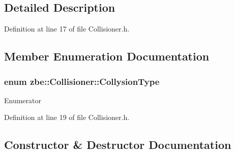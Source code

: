 \subsection{Detailed Description}


Definition at line 17 of file Collisioner.\+h.



\subsection{Member Enumeration Documentation}
\hypertarget{classzbe_1_1_collisioner_af210f5ae0183381df428b4b4f72946eb}{}
\subsubsection[{Collysion\+Type}]{\setlength{\rightskip}{0pt plus 5cm}enum {\bf zbe\+::\+Collisioner\+::\+Collysion\+Type}}\label{classzbe_1_1_collisioner_af210f5ae0183381df428b4b4f72946eb}
\begin{Desc}
\item[Enumerator]\par
\begin{description}
\item[{\em 
\hypertarget{classzbe_1_1_collisioner_af210f5ae0183381df428b4b4f72946eba65bc42fd5c16096214440f43460a4b7d}{}S\+P\+H\+E\+R\+E\label{classzbe_1_1_collisioner_af210f5ae0183381df428b4b4f72946eba65bc42fd5c16096214440f43460a4b7d}
}]\item[{\em 
\hypertarget{classzbe_1_1_collisioner_af210f5ae0183381df428b4b4f72946ebad842cd828b17a573ed9d7d9c4f810816}{}A\+A\+B\+B\label{classzbe_1_1_collisioner_af210f5ae0183381df428b4b4f72946ebad842cd828b17a573ed9d7d9c4f810816}
}]\end{description}
\end{Desc}


Definition at line 19 of file Collisioner.\+h.



\subsection{Constructor \& Destructor Documentation}
\hypertarget{classzbe_1_1_collisioner_a925d62e829a8c7d8a3589a8de01453d5}{}
